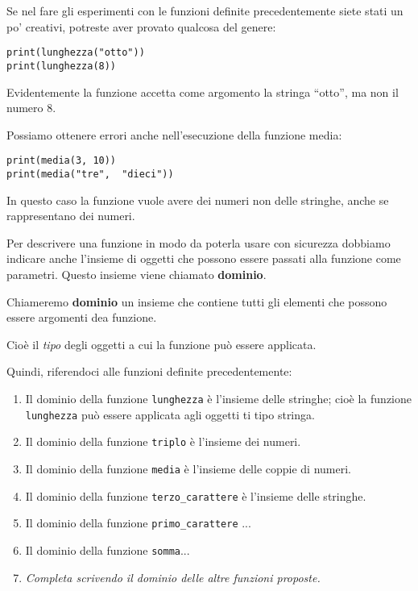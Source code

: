 Se nel fare gli esperimenti con le funzioni definite precedentemente siete 
stati un po' creativi, potreste aver provato qualcosa del genere:

\begin{lstlisting}
print(lunghezza("otto"))
print(lunghezza(8))
\end{lstlisting}

Evidentemente la funzione accetta come argomento la stringa  ``otto'', ma 
non il numero 8.

Possiamo ottenere errori anche nell'esecuzione della funzione media:

\begin{lstlisting}
print(media(3, 10))
print(media("tre",  "dieci"))
\end{lstlisting}

In questo caso la funzione vuole avere dei numeri non delle stringhe, anche 
se rappresentano dei numeri.

Per descrivere una funzione in modo da poterla usare con sicurezza 
dobbiamo indicare anche l'insieme di oggetti che possono essere passati 
alla funzione come parametri. Questo insieme viene chiamato 
\textbf{dominio}.

\begin{definizione}
Chiameremo \textbf{dominio} un insieme che contiene tutti gli elementi che 
possono essere argomenti dea funzione.
\end{definizione}

Cioè il \emph{tipo} degli oggetti a cui la funzione può essere applicata.

Quindi, riferendoci alle funzioni definite precedentemente:

\begin{enumerate} [noitemsep]
\item Il dominio della funzione \texttt{lunghezza} è l'insieme delle 
stringhe; cioè la funzione \texttt{lunghezza} può essere applicata agli 
oggetti ti tipo stringa.
\item Il dominio della funzione \texttt{triplo} è l'insieme dei numeri.
\item Il dominio della funzione \texttt{media} è l'insieme delle coppie di 
numeri.
\item Il dominio della funzione \texttt{terzo\_carattere} è l'insieme delle 
stringhe.
\item Il dominio della funzione \texttt{primo\_carattere} ...
\item Il dominio della funzione \texttt{somma}...
\item \emph{Completa scrivendo il dominio delle altre funzioni proposte.}
\end{enumerate}

